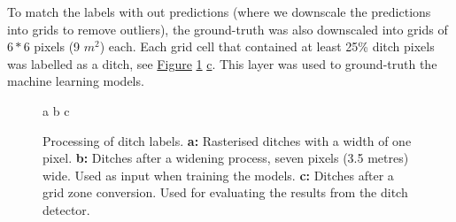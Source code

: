 \documentclass[11pt, review]{elsarticle} %
\begin{document}
To match the labels with out predictions (where we downscale the predictions into grids to remove outliers), the ground-truth was also downscaled into grids of $6*6$ pixels (9 $m^2$) each. Each grid cell that contained at least 25\% ditch pixels was labelled as a ditch, see \hyperref[fig:ditchpreprocess]{Figure} \ref{fig:ditchpreprocess} \hyperref[fig:ditchpreprocess]{c}. This layer was used to ground-truth the machine learning models.

\begin{figure} [htb!]
    \centering
    a{
        }\hspace{5pt}
    b{
        }
    c{
        }
    \caption{Processing of ditch labels. \textbf{a: }Rasterised ditches with a width of one pixel. \textbf{b: }Ditches after a widening process, seven pixels (3.5 metres) wide. Used as input when training the models. \textbf{c: }Ditches after a grid zone conversion. Used for evaluating the results from the ditch detector.} \label{sample-figure}
    \label{fig:ditchpreprocess}
\end{figure}
\end{document}
